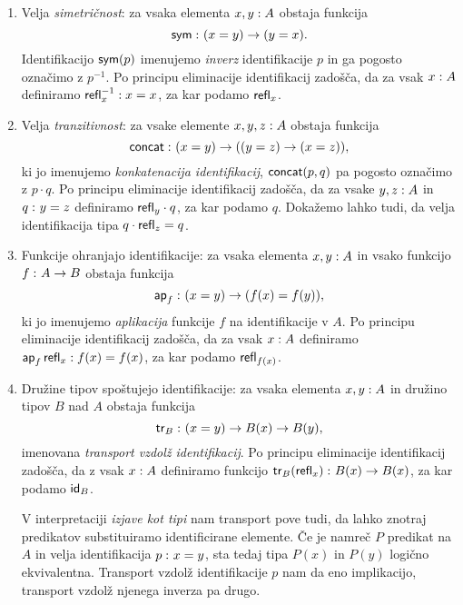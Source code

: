 \begin{enumerate}
\item Velja \emph{simetričnost}: za vsaka elementa \(x, y : A\) obstaja
  funkcija \[\textnormal{\textsf{sym}} \,\colon (x = y) \to (y = x).\] Identifikacijo \(\textnormal{\textsf{sym}}(p)\)
  imenujemo \emph{inverz} identifikacije \(p\) in ga pogosto označimo z \(p^{-1}\).
  Po principu eliminacije identifikacij zadošča, da za vsak \(x : A\) definiramo \(\textnormal{\textsf{refl}}_{x}^{-1} : x = x\), za kar podamo \(\textnormal{\textsf{refl}}_{x}\).
\item Velja \emph{tranzitivnost}: za vsake elemente \(x, y, z : A\) obstaja
  funkcija \[\textnormal{\textsf{concat}} \,\colon (x = y) \to ((y = z) \to (x = z)),\] ki jo imenujemo
  \emph{konkatenacija identifikacij}, \(\textnormal{\textsf{concat}}(p, q)\) pa pogosto označimo
  z \(p \cdot q\). Po principu eliminacije identifikacij zadošča, da za vsake \(y, z : A\) in \(q \,\colon y = z\) definiramo \(\textnormal{\textsf{refl}}_{y}\cdot q\), za kar podamo \(q\). Dokažemo lahko tudi, da velja identifikacija tipa \(q \cdot \textnormal{\textsf{refl}}_{z} = q\).
\item Funkcije ohranjajo identifikacije: za vsaka elementa \(x, y : A\)
  in vsako funkcijo \(f \,\colon A \to B\) obstaja funkcija
  \[\textnormal{\textsf{ap}}_{f} \,\colon (x = y) \to (f(x) = f(y)),\]
  ki jo imenujemo \emph{aplikacija} funkcije \(f\) na identifikacije v \(A\). Po principu eliminacije identifikacij zadošča, da za vsak \(x : A\) definiramo
  \(\textnormal{\textsf{ap}}_{f}\,\textnormal{\textsf{refl}}_{x} : f(x) = f(x)\), za kar podamo \(\textnormal{\textsf{refl}}_{f(x)}\).
\item Družine tipov spoštujejo identifikacije: za vsaka elementa
  \(x, y : A\) in družino tipov
  \(B\) nad \(A\) obstaja funkcija
  \[\textnormal{\textsf{tr}}_{B} \,\colon (x = y) \to B(x) \to B(y),\]
  imenovana \emph{transport vzdolž identifikacij}.
  Po principu eliminacije identifikacij zadošča, da z vsak \(x : A\) definiramo funkcijo \(\textnormal{\textsf{tr}}_{B}(\textnormal{\textsf{refl}}_{x}) \,\colon B(x) \to B(x)\), za kar podamo \(\textnormal{\textsf{id}}_{B}\).

  V interpretaciji \emph{izjave kot tipi} nam transport pove tudi, da lahko znotraj
  predikatov substituiramo identificirane elemente. Če je namreč \(P\) predikat
  na \(A\) in velja identifikacija \(p \,\colon x = y\), sta tedaj tipa \(P(x)\) in \(P(y)\) logično ekvivalentna. Transport vzdolž identifikacije \(p\) nam da eno implikacijo, transport vzdolž njenega inverza pa drugo.
\end{enumerate}

